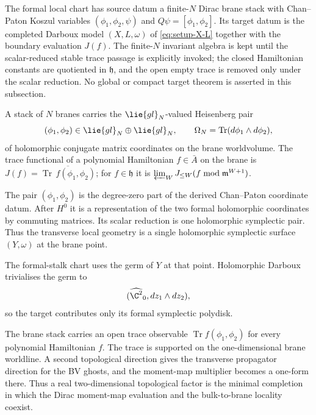 \documentclass[11pt]{memoir}
\begin{document}
The formal local chart has source datum a finite-\(N\) Dirac brane stack
with Chan--Paton
Koszul variables \((\phi_1,\phi_2,\psi)\) and \(Q\psi=[\phi_1,\phi_2]\).
Its target datum is the completed Darboux model
\((X,L,\omega)\) of \eqref{eq:setup-X-L} together with the boundary
evaluation \(J(f)\).  The finite-\(N\) invariant algebra is kept until
the scalar-reduced stable trace passage is explicitly invoked; the
closed Hamiltonian constants are quotiented in \(\mathfrak h\), and the
open empty trace is removed only under the scalar reduction.  No global
or compact target theorem is asserted in this subsection.

A stack of \(N\) branes carries the \(\lie{gl}_N\)-valued Heisenberg
pair
\[
  (\phi_1,\phi_2)\in\lie{gl}_N\oplus\lie{gl}_N,\qquad
  \Omega_N=\operatorname{Tr}(d\phi_1\wedge d\phi_2),
\]
of holomorphic conjugate matrix coordinates on the brane worldvolume.
The trace functional of a polynomial Hamiltonian \(f\in\bar A\) on the
brane is \(J(f)=\overline{\operatorname{Tr}\,f(\phi_1,\phi_2)}\); for
\(f\in\mathfrak h\) it is
\(\varprojlim_WJ_{\leq W}(f\bmod\mathfrak m^{W+1})\).

The pair \((\phi_1,\phi_2)\) is the degree-zero part of the derived
Chan--Paton coordinate datum.  After \(H^0\) it is a representation of
the two formal holomorphic coordinates by commuting matrices.  Its
scalar reduction is one
holomorphic symplectic pair.  Thus the transverse local geometry is a
single holomorphic symplectic surface \((Y,\omega)\) at the brane
point.

The formal-stalk chart uses the germ of \(Y\) at that point.
Holomorphic Darboux
trivialises the germ to
\[
  (\widehat{\C^2}_0,dz_1\wedge dz_2),
\]
so the target contributes only its formal symplectic polydisk.

The brane stack carries an open trace observable
\(\operatorname{Tr}f(\phi_1,\phi_2)\) for every polynomial Hamiltonian \(f\).  The
trace is supported on the one-dimensional brane worldline.  A second
topological direction gives the transverse propagator direction for
the BV ghosts, and the moment-map multiplier becomes a one-form there.
Thus a real two-dimensional topological factor is the minimal
completion in which the Dirac
moment-map evaluation and the bulk-to-brane locality coexist.
\end{document}
